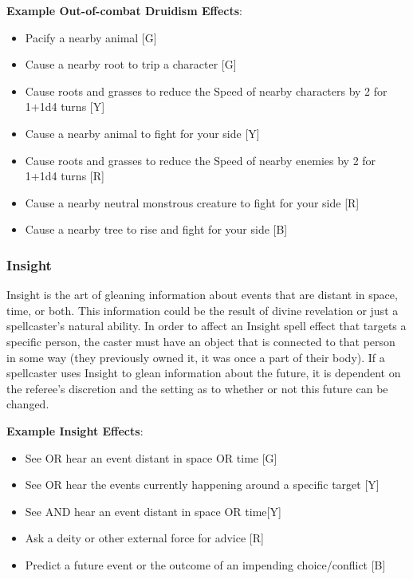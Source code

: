 \documentclass[oneside]{book}
\begin{document}
\begin{multicols}{2}
\textbf{Example Out-of-combat Druidism Effects}: 
	\begin{itemize}
		\setlength{\itemsep}{0cm}%
  		\setlength{\parskip}{0cm}%
		\item{ \small Pacify a nearby animal [G]}
		\item{ \small Cause a nearby root to trip a character [G]}
		\item{ \small Cause roots and grasses to reduce the Speed of nearby characters by 2 for 1+1d4 turns [Y]}
		\item{ \small Cause a nearby animal to fight for your side [Y]}
		\item{ \small Cause roots and grasses to reduce the Speed of nearby enemies by 2 for 1+1d4 turns [R]}
		\item{ \small Cause a nearby neutral monstrous creature to fight for your side [R]}
		\item{ \small Cause a nearby tree to rise and fight for your side [B]}
	\end{itemize}

\subsubsection{Insight}
Insight is the art of gleaning information about events that are distant in space, time, or both. This information could be the result of divine revelation or just a spellcaster's natural ability. In order to affect an Insight spell effect that targets a specific person, the caster must have an object that is connected to that person in some way (they previously owned it, it was once a part of their body). If a spellcaster uses Insight to glean information about the future, it is dependent on the referee's discretion and the setting as to whether or not this future can be changed.

\textbf{Example Insight Effects}:
	\begin{itemize}
		\setlength{\itemsep}{0cm}%
  		\setlength{\parskip}{0cm}%
		\item{ \small See OR hear an event distant in space OR time [G]}
		\item{ \small See OR hear the events currently happening around a specific target [Y]}
		\item{ \small See AND hear an event distant in space OR time[Y]}
		\item{ \small Ask a deity or other external force for advice [R]}
		\item{ \small Predict a future event or the outcome of an impending choice/conflict [B]}
	\end{itemize}


\end{multicols}
\end{document}
